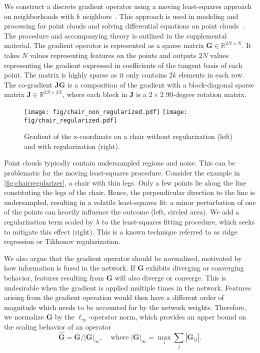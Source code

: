 \documentclass[acmtog, authorversion]{acmart}
\begin{document}
We construct a discrete gradient operator using a moving least-squares approach on neighborhoods with $k$ neighbors~\cite{Nealen2004}. This approach is used in modeling and processing for point clouds and solving differential equations on point clouds~\cite{crane2013geodesics, Liang2013SolvingPD}. The procedure and accompanying theory is outlined in the supplemental material. The gradient operator is represented as a sparse matrix $\mathbf{G} \in \mathbb{R}^{2N \times N}$. It takes $N$ values representing features on the points and outputs $2N$ values representing the gradient expressed in coefficients of the tangent basis of each point. The matrix is highly sparse as it only contains $2k$ elements in each row. The co-gradient $\mathbf{JG}$ is a composition of the gradient with a block-diagonal sparse matrix $\mathbf{J} \in \mathbb{R}^{2N \times 2N}$, where each block in $\mathbf{J}$ is a $2\times2 $ 90-degree rotation matrix.

\begin{figure}[b]
    \centering
        \texttt{[image: fig/chair\_non\_regularized.pdf]}
        \texttt{[image: fig/chair\_regularized.pdf]}
    \caption{Gradient of the x-coordinate on a chair without regularization (left) and with regularization (right).
    }
    \label{fig:chairregularizer}
\end{figure}

Point clouds typically contain undersampled regions and noise. This can be problematic for the moving least-squares procedure. Consider the example in \autoref{fig:chairregularizer}, a chair with thin legs. Only a few points lie along the line constituting the legs of the chair. Hence, the perpendicular direction to the line is undersampled, resulting in a volatile least-squares fit: a minor perturbation of one of the points can heavily influence the outcome (left, circled area). We add a regularization term scaled by $\lambda$ to the least-squares fitting procedure, which seeks to mitigate this effect (right). This is a known technique referred to as ridge regression or Tikhonov regularization.

We also argue that the gradient operator should be normalized, motivated by how information is fused in the network. If $\mathbf{G}$ exhibits diverging or converging behavior, features resulting from $\mathbf{G}$ will also diverge or converge. This is undesirable when the gradient is applied multiple times in the network. Features arising from the gradient operation would then have a different order of magnitude which needs to be accounted for by the network weights. Therefore, we normalize $\mathbf{G}$ by the  $\ell_\infty$-operator norm, which provides an upper bound on the scaling behavior of an operator
\begin{equation}
    \mathbf{\hat{G}} = \mathbf{G} / |\mathbf{G}|_{\infty},\, \quad\text{where} \,\, |\mathbf{G}|_{\infty} = \max_{i} \sum_{j} |\mathbf{G}_{ij}|.
\end{equation}
\end{document}
